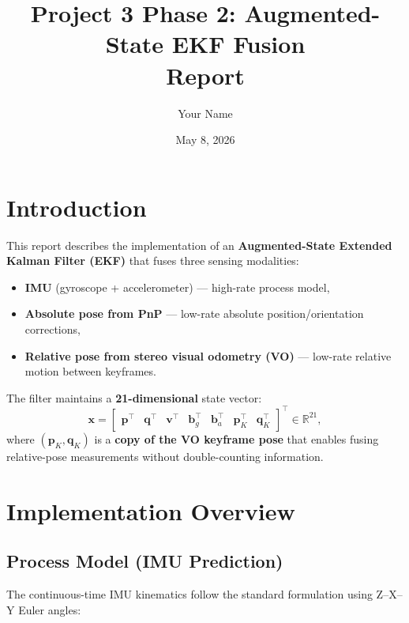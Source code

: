 \documentclass[11pt,a4paper]{article}
\title{\vspace{-2em}%
  \textbf{Project 3 Phase 2: Augmented-State EKF Fusion} \\[0.3em]
  \large Report}
\author{Your Name}
\date{May 8, 2026}
\begin{document}
\maketitle

\section{Introduction}
\label{sec:intro}

This report describes the implementation of an \textbf{Augmented-State Extended Kalman Filter (EKF)} that fuses three sensing modalities:
\begin{itemize}
  \item \textbf{IMU} (gyroscope + accelerometer) --- high-rate process model,
  \item \textbf{Absolute pose from PnP} --- low-rate absolute position/orientation corrections,
  \item \textbf{Relative pose from stereo visual odometry (VO)} --- low-rate relative motion between keyframes.
\end{itemize}

The filter maintains a \textbf{21-dimensional} state vector:
\[
\mathbf{x} = \begin{bmatrix}
\mathbf{p}^\top & \mathbf{q}^\top & \mathbf{v}^\top &
\mathbf{b}_g^\top & \mathbf{b}_a^\top &
\mathbf{p}_K^\top & \mathbf{q}_K^\top
\end{bmatrix}^\top \in \mathbb{R}^{21},
\]
where \((\mathbf{p}_K, \mathbf{q}_K)\) is a \textbf{copy of the VO keyframe pose} that enables
fusing relative-pose measurements without double-counting information.

\section{Implementation Overview}
\label{sec:impl}

\subsection{Process Model (IMU Prediction)}

The continuous-time IMU kinematics follow the standard formulation using Z--X--Y Euler angles:
\end{document}
